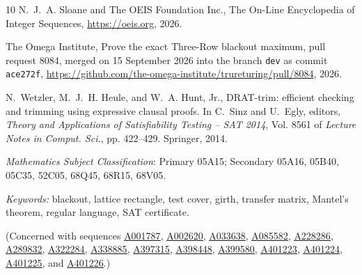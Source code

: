 \documentclass[12pt]{article}
\theoremstyle{plain}
\theoremstyle{definition}
\theoremstyle{remark}
\newcommand{\seqnum}[1]{\href{https://oeis.org/#1}{\rm \underline{#1}}}
\begin{document}
\begin{thebibliography}{10}
N.~J.~A. Sloane and {The OEIS Foundation Inc.}, The {O}n-{L}ine {E}ncyclopedia
  of {I}nteger {S}equences, \url{https://oeis.org}, 2026.

{The Omega Institute}, Prove the exact {T}hree-{R}ow blackout maximum, pull
  request 8084, merged on 15 September 2026 into the branch \texttt{dev} as
  commit \texttt{ace272f},
  \url{https://github.com/the-omega-institute/trureturing/pull/8084}, 2026.

N.~Wetzler, M.~J.~H. Heule, and W.~A. Hunt, Jr., {DRAT-trim}: efficient
  checking and trimming using expressive clausal proofs.
\newblock In C.~Sinz and U.~Egly, editors, {\em Theory and Applications of
  Satisfiability Testing -- {SAT} 2014}, Vol. 8561 of {\em Lecture Notes in
  Comput. Sci.}, pp.  422--429. Springer, 2014.

\end{thebibliography}

 {\it Mathematics Subject Classification}: Primary 05A15; Secondary
05A16, 05B40, 05C35, 52C05, 68Q45, 68R15, 68V05.

\noindent \emph{Keywords:} blackout, lattice rectangle, test cover, girth, transfer
matrix, Mantel's theorem, regular language, SAT certificate.

\noindent (Concerned with sequences
\seqnum{A001787},
\seqnum{A002620},
\seqnum{A033638},
\seqnum{A085582},
\seqnum{A228286},
\seqnum{A289832},
\seqnum{A322284},
\seqnum{A338885},
\seqnum{A397315},
\seqnum{A398448},
\seqnum{A399580},
\seqnum{A401223},
\seqnum{A401224},
\seqnum{A401225}, and
\seqnum{A401226}.)
\end{document}
